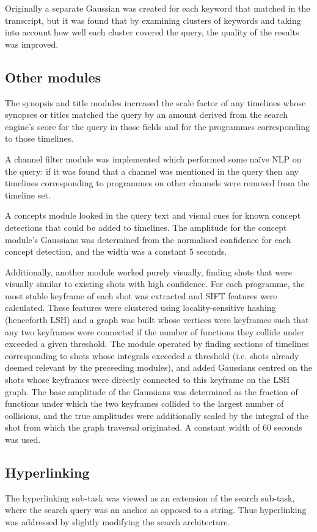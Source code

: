 \documentclass{../acm_proc_article-me11_tweaked}
\begin{document}
Originally a separate Gaussian was created for each keyword that matched in 
the transcript, but it was found that by examining clusters of keywords and 
taking into account how well each cluster covered the query, the quality of 
the results was improved.

\subsection{Other modules}
The synopsis and title modules increased the scale factor of any timelines 
whose synopses or titles matched the query by an amount derived from the 
search engine's score for the query in those fields and for the programmes 
corresponding to those timelines.

A channel filter module was implemented which performed some naïve NLP on the 
query: if it was found that a channel was mentioned in the query then any 
timelines corresponding to programmes on other channels were removed from the 
timeline set.

A concepts module looked in the query text and visual cues for known concept 
detections that could be added to timelines. The amplitude for the concept 
module's Gaussians was determined from the normalised confidence for each 
concept detection, and the width was a constant 5 seconds.

Additionally, another module worked purely visually, finding shots that were 
visually similar to existing shots with high confidence. For each programme, 
the most stable keyframe of each shot was extracted and SIFT features were 
calculated. These features were clustered using locality-sensitive hashing 
(henceforth LSH) and a graph was built whose vertices were keyframes such that 
any two keyframes were connected if the number of functions they collide under 
exceeded a given threshold. The module operated by finding sections of 
timelines corresponding to shots whose integrals exceeded a threshold (i.e. 
shots already deemed relevant by the preceeding modules), and added Gaussians 
centred on the shots whose keyframes were directly connected to this keyframe 
on the LSH graph. The base amplitude of the Gaussians was determined as the 
fraction of functions under which the two keyframes collided to the largest 
number of collisions, and the true amplitudes were additionally scaled by the 
integral of the shot from which the graph traversal originated. A constant 
width of 60 seconds was used.

\subsection{Hyperlinking}
The hyperlinking sub-task was viewed as an extension of the search sub-task, 
where the search query was an anchor as opposed to a string. Thus hyperlinking 
was addressed by slightly modifying the search architecture. 
\end{document}
